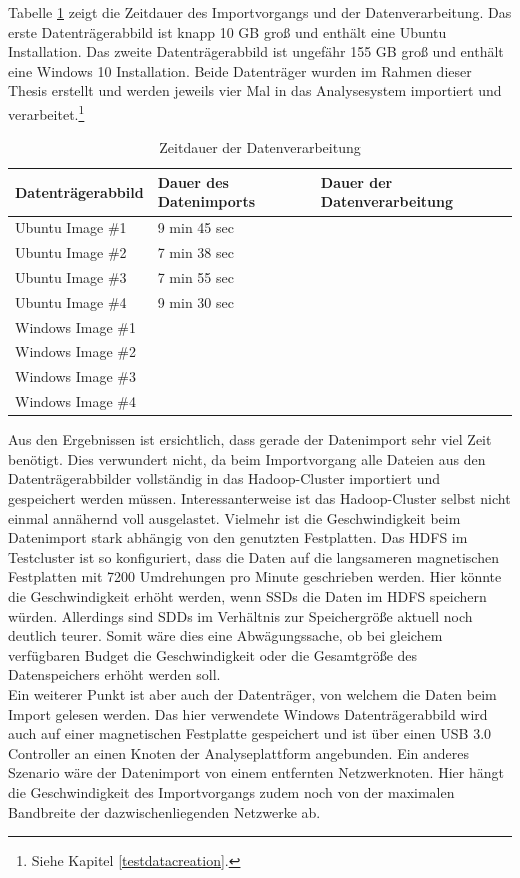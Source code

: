 \noindent
Tabelle \ref{tab:performance_results} zeigt die Zeitdauer des Importvorgangs und der Datenverarbeitung. Das erste Datenträgerabbild ist knapp 10 GB groß und enthält eine Ubuntu Installation. Das zweite Datenträgerabbild ist ungefähr 155 GB groß und enthält eine Windows 10 Installation. Beide Datenträger wurden im Rahmen dieser Thesis erstellt und werden jeweils vier Mal in das Analysesystem importiert und verarbeitet.\footnote{Siehe Kapitel \ref{testdatacreation}.} \\


\begin{table}[ht]
\centering
\begin{tabular}{l||ll}
Datenträgerabbild & Dauer des Datenimports & Dauer der Datenverarbeitung	\\ \hline
Ubuntu Image \#1 		& 9 min 45 sec	& 		\\
Ubuntu Image \#2 		& 7 min 38 sec	&  			\\
Ubuntu Image \#3 		& 7 min 55 sec	&		\\
Ubuntu Image \#4 		& 9 min 30 sec	&	\\ \hline
Windows Image \#1 		&  				&		\\
Windows Image \#2 		&  				&	\\
Windows Image \#3 		&  				&	\\
Windows Image \#4 		&  				&		\\
\end{tabular}
\caption{Zeitdauer der Datenverarbeitung}
\label{tab:performance_results}
\end{table}

\noindent
Aus den Ergebnissen ist ersichtlich, dass gerade der Datenimport sehr viel Zeit benötigt. Dies verwundert nicht, da beim Importvorgang alle Dateien aus den Datenträgerabbilder vollständig in das Hadoop-Cluster importiert und gespeichert werden müssen. Interessanterweise ist das Hadoop-Cluster selbst nicht einmal annähernd voll ausgelastet. Vielmehr ist die Geschwindigkeit beim Datenimport stark abhängig von den genutzten Festplatten. Das HDFS im Testcluster ist so konfiguriert, dass die Daten auf die langsameren magnetischen Festplatten mit 7200 Umdrehungen pro Minute geschrieben werden. Hier könnte die Geschwindigkeit erhöht werden, wenn SSDs die Daten im HDFS speichern würden. Allerdings sind SDDs im Verhältnis zur Speichergröße aktuell noch deutlich teurer. Somit wäre dies eine Abwägungssache, ob bei gleichem verfügbaren Budget die Geschwindigkeit oder die Gesamtgröße des Datenspeichers erhöht werden soll.\\
Ein weiterer Punkt ist aber auch der Datenträger, von welchem die Daten beim Import gelesen werden. Das hier verwendete Windows Datenträgerabbild wird auch auf einer magnetischen Festplatte gespeichert und ist über einen USB 3.0 Controller an einen Knoten der Analyseplattform angebunden. Ein anderes Szenario wäre der Datenimport von einem entfernten Netzwerknoten. Hier hängt die Geschwindigkeit des Importvorgangs zudem noch von der maximalen Bandbreite der dazwischenliegenden Netzwerke ab.\\

